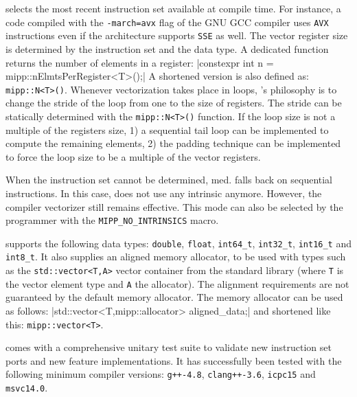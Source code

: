 \MIPP selects the most recent instruction set available at compile time. For
instance, a code compiled with the \verb|-march=avx| flag of the GNU GCC
compiler uses \verb|AVX| instructions even if the architecture supports
\verb|SSE| as well. The vector register size is determined by the instruction
set and the data type. A dedicated function returns the number of elements in a
\MIPP register:
|constexpr int n = mipp::nElmtsPerRegister<T>();|
{\noindent
A shortened version is also defined as: \verb|mipp::N<T>()|. Whenever
vectorization takes place in loops, \MIPP's philosophy is to change the stride
of the loop from one to the size of registers. The stride can be statically
determined with the \verb|mipp::N<T>()| function.
If the loop size is not a multiple of the registers size, 1) a sequential tail
loop can be implemented to compute the remaining elements, 2) the padding
technique can be implemented to force the loop size to be a multiple of the
vector registers.
}

When the instruction set cannot be determined, \MIPP med. falls back on
sequential instructions. In this case, \MIPP does not use any intrinsic anymore.
However, the compiler vectorizer still remains effective. This mode can also be
selected by the programmer with the \verb|MIPP_NO_INTRINSICS| macro.

\MIPP supports the following data types: \verb|double|, \verb|float|,
\verb|int64_t|, \verb|int32_t|, \verb|int16_t| and \verb|int8_t|. It also
supplies an aligned memory allocator, to be used with types such as the
\verb|std::vector<T,A>| vector container from the \Cxx standard library (where
\verb|T| is the vector element type and \verb|A| the allocator). The alignment
requirements are not guaranteed by the default \Cxx memory allocator. The \MIPP
memory allocator can be used as follows:
|std::vector<T,mipp::allocator> aligned_data;|
{\noindent
and shortened like this: \verb|mipp::vector<T>|.
}

\MIPP comes with a comprehensive unitary test suite to validate new instruction
set ports and new feature implementations. It has successfully been tested with
the following minimum compiler versions: \verb|g++-4.8|, \verb|clang++-3.6|,
\verb|icpc15| and \verb|msvc14.0|.

